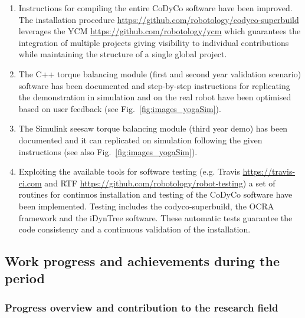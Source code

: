 \documentclass[12pt,a4paper,twoside]{article}
\begin{document}
\begin{enumerate}
\item Instructions for compiling the entire CoDyCo software have been improved. The installation procedure \url{https://github.com/robotology/codyco-superbuild} leverages the YCM \url{https://github.com/robotology/ycm} which guarantees the integration of multiple projects giving visibility to individual contributions while maintaining the structure of a single global project.  
	
\item The C++ torque balancing module (first and second year validation scenario) software has been documented and step-by-step instructions for replicating the demonstration in simulation and on the real robot have been optimised based on user feedback (see Fig.~\ref{fig:images_yogaSim}).

\item The Simulink seesaw torque balancing module (third year demo) has been documented and it can replicated on simulation following the given instructions (see also Fig.~\ref{fig:images_yogaSim}). 

\item Exploiting the available tools for software testing (e.g. Travis \url{https://travis-ci.com} and RTF \url{https://github.com/robotology/robot-testing}) a set of routines for continuos installation and testing of the CoDyCo software have been implemented. Testing includes the codyco-superbuild, the OCRA framework and the iDynTree software. These automatic tests guarantee the code consistency and a continuous validation of the installation.

\end{enumerate}










\subsection{Work progress and achievements during the period}

\subsubsection{Progress overview and contribution to the research field}
\end{document}
